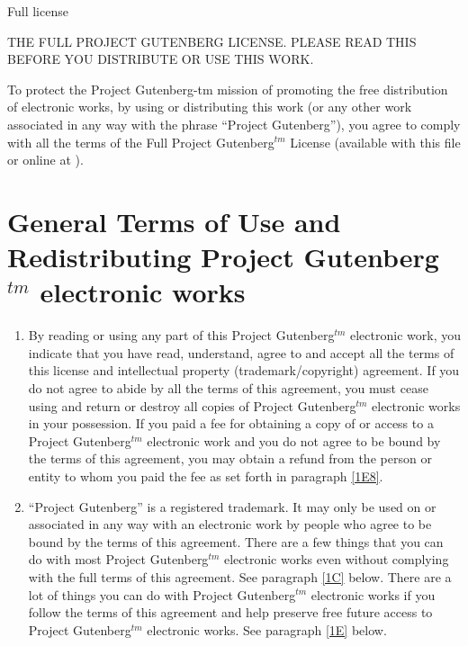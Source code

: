 \begin{chapter}{Full license}\label{license}

THE FULL PROJECT GUTENBERG LICENSE.
PLEASE READ THIS BEFORE YOU DISTRIBUTE OR USE THIS WORK.

To protect the Project Gutenberg-tm mission of promoting the free
distribution of electronic works, by using or distributing this work
(or any other work associated in any way with the phrase ``Project
Gutenberg''), you agree to comply with all the terms of the Full Project
Gutenberg$^{tm}$ License (available with this file or online at
).

\section[General Terms]{General Terms of Use and Redistributing Project
Gutenberg$^{tm}$ electronic works}

\begin{enumerate} 
\item By reading or using any part of this Project Gutenberg$^{tm}$
electronic work, you indicate that you have read, understand, agree to
and accept all the terms of this license and intellectual property
(trademark/copyright) agreement.  If you do not agree to abide by all
the terms of this agreement, you must cease using and return or destroy
all copies of Project Gutenberg$^{tm}$ electronic works in your possession.
If you paid a fee for obtaining a copy of or access to a Project
Gutenberg$^{tm}$ electronic work and you do not agree to be bound by the
terms of this agreement, you may obtain a refund from the person or
entity to whom you paid the fee as set forth in paragraph \ref{1E8}.

\item ``Project Gutenberg'' is a registered trademark.  It may only be
used on or associated in any way with an electronic work by people who
agree to be bound by the terms of this agreement.  There are a few
things that you can do with most Project Gutenberg$^{tm}$ electronic works
even without complying with the full terms of this agreement.  See
paragraph \ref{1C} below.  There are a lot of things you can do with Project
Gutenberg$^{tm}$ electronic works if you follow the terms of this agreement
and help preserve free future access to Project Gutenberg$^{tm}$ electronic
works.  See paragraph \ref{1E} below.


\end{enumerate}
\end{chapter}
